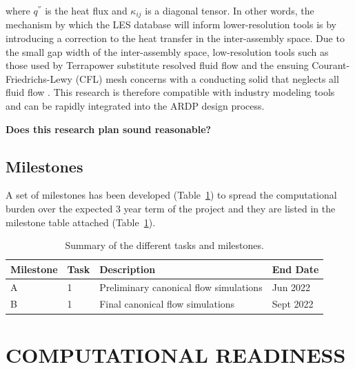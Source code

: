 where \(q^{''}\) is the heat flux and \(\kappa_{ij}\) is a diagonal tensor. In other words, the mechanism by which the LES database will inform lower-resolution tools is by introducing a correction to the heat transfer in the inter-assembly space. Due to the small gap width of the inter-assembly space, low-resolution tools such as those used by Terrapower substitute resolved fluid flow and the ensuing Courant-Friedrichs-Lewy (CFL) mesh concerns with a conducting solid that neglects all fluid flow \cite{touran}. This research is therefore compatible with industry modeling tools and can be rapidly integrated into the ARDP design process.

{\bf Does this research plan sound reasonable?}


\vspace{-.25in}
\subsection{Milestones}
\vspace{-.2in}


A set of milestones has been developed (Table~\ref{tab:milestones}) to spread the computational burden over
the expected 3 year term of the project and they are listed in the milestone table attached (Table~\ref{tab:milestones}).

\begin{table}
\centering
\caption{Summary of the different tasks and milestones.}
\begin{tabular}{llll}
\hline
\hline
Milestone & Task & Description & End Date \\
\hline
\hline
A & 1 & Preliminary canonical flow simulations   & Jun  2022 \\
B & 1 & Final canonical flow simulations         & Sept 2022 \\
\hline
\hline
\end{tabular}
\label{tab:milestones}
\end{table}

\vspace{-.25in}
\section{COMPUTATIONAL READINESS} %
\vspace{-.2in}

